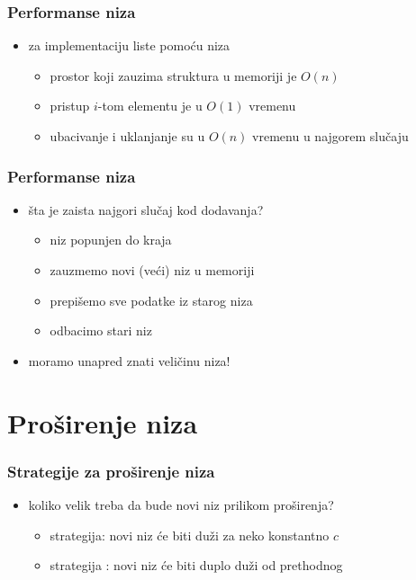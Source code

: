 \documentclass[compress,aspectratio=169]{beamer}
\begin{document}
\begin{frame}[fragile]
  \frametitle{Performanse niza}
  \begin{itemize}
    \item za implementaciju liste pomoću niza
    \begin{itemize}
      \item prostor koji zauzima struktura u memoriji je $O(n)$
      \item pristup $i$-tom elementu je u $O(1)$ vremenu
      \item ubacivanje i uklanjanje su u $O(n)$ vremenu u najgorem slučaju
    \end{itemize}
  \end{itemize}
\end{frame}

\begin{frame}[fragile]
  \frametitle{Performanse niza}
  \begin{itemize}
    \item šta je zaista najgori slučaj kod dodavanja?
    \begin{itemize}
      \item niz popunjen do kraja
      \item zauzmemo novi (veći) niz u memoriji
      \item prepišemo sve podatke iz starog niza
      \item odbacimo stari niz
    \end{itemize}
    \item moramo unapred znati veličinu niza!
  \end{itemize}
\end{frame}

\section[Proširenje]{Proširenje niza}
\begin{frame}[fragile]
  \frametitle{Strategije za proširenje niza}
  \begin{itemize}
    \item koliko velik treba da bude novi niz prilikom proširenja?
    \begin{itemize}
      \item {} strategija: novi niz će biti duži za neko
      konstantno $c$
      \item strategija : novi niz će biti duplo duži od
      prethodnog
    \end{itemize}
  \end{itemize}
\end{frame}
\end{document}
